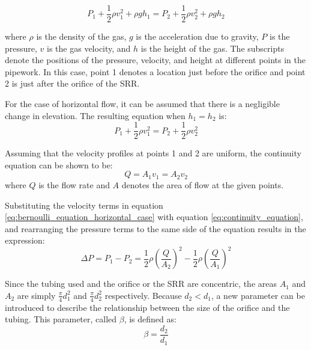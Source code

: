 \begin{equation}
    P_1 + \frac{1}{2} \rho v^2_1 + \rho g h_1 = P_2 + \frac{1}{2} \rho v^2_2 + \rho g h_2
    \label{eq:bernoulli_equation}
\end{equation}

where $\rho$ is the density of the gas, $g$ is the acceleration due to gravity, $P$ is the pressure, $v$ is the gas velocity, and $h$ is the height of the gas. The subscripts denote the positions of the pressure, velocity, and height at different points in the pipework. In this case, point 1 denotes a location just before the orifice and point 2 is just after the orifice of the SRR.

For the case of horizontal flow, it can be assumed that there is a negligible change in elevation. The resulting equation when $h_1 = h_2$ is:
\begin{equation}
    P_1 + \frac{1}{2} \rho v^2_1  = P_2 + \frac{1}{2} \rho v^2_2
    \label{eq:bernoulli_equation_horizontal_case}
\end{equation}

Assuming that the velocity profiles at points 1 and 2 are uniform, the continuity equation can be shown to be:
\begin{equation}
    Q = A_1 v_1  = A_2 v_2 
    \label{eq:continuity_equation}
\end{equation}
where $Q$ is the flow rate and $A$ denotes the area of flow at the given points. 

Substituting the velocity terms in equation \ref{eq:bernoulli_equation_horizontal_case} with equation \ref{eq:continuity_equation}, and rearranging the pressure terms to the same side of the equation results in the expression:
\begin{equation}
    \Delta P = P_1 - P_2 = \frac{1}{2} \rho \left (\frac{Q}{A_2} \right )^2 - \frac{1}{2} \rho \left (\frac{Q}{A_1} \right )^2
    \label{eq:bernoulli_equation_horizontal_case_with_continuity}
\end{equation}


Since the tubing used and the orifice or the SRR are concentric, the areas $A_1$ and $A_2$ are simply $\frac{\pi}{4} d_1^2$ and $\frac{\pi}{4} d_2^2$ respectively. Because $d_2 < d_1$, a new parameter can be introduced to describe the relationship between the size of the orifice and the tubing. This parameter, called $\beta$, is defined as:
\begin{equation}
    \beta = \frac{d_2}{d_1}
\end{equation}

